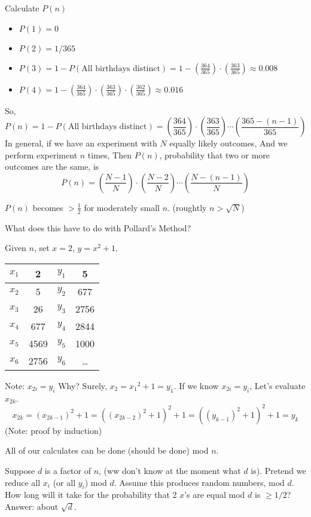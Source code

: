 Calculate $P(n)$
\begin{itemize}
	\item[] $P(1) = 0$ 
	\item[] $P(2) = 1/365$ 
	\item[] $P(3) = 1 - P(\mbox{All birthdays distinct}) = 1 - (\frac{364}{365})\cdot (\frac{363}{365}) \approx 0.008$ 
	\item[] $P(4) = 1 - (\frac{364}{365})\cdot (\frac{363}{365}) \cdot (\frac{362}{365})\approx 0.016$ 
\end{itemize}
So, 
\[
P(n) = 1 - P(\mbox{All birthdays distinct}) = \left(\frac{364}{365}\right)\cdot \left(\frac{363}{365}\right) \cdots \left(\frac{365 - (n-1)}{365}\right)
\]
In general, if we have an experiment with $N$ equally likely outcomes, And we perform experiment $n$ times, Then $P(n)$, probability that two or more outcomes are the same, is
\[
P(n) = \left(\frac{N-1}{N}\right)\cdot \left(\frac{N-2}{N}\right) \cdots \left(\frac{N - (n-1)}{N}\right)
\]

$P(n)$ becomes $> \frac{1}{2}$ for moderately small $n$. (roughtly $n > \sqrt{N}$)

What does this have to do with Pollard's Method?

Given $n$, set $x=2$, $y = x^2 + 1$.

\begin{tabular}{|c|c|c|c|} \hline
	$x_1$ & 2 & $y_1$ & 5 \\ \hline
	$x_2$ & 5 & $y_2$ & 677 \\ \hline
	$x_3$ & 26 & $y_3$ & 2756 \\ \hline
	$x_4$ & 677 & $y_4$ &  2844 \\ \hline
	$x_5$ & 4569 & $y_5$ & 1000 \\ \hline
	$x_6$ & 2756 & $y_6$ & \ldots \\ \hline
\end{tabular}

Note: $x_{2i} = y_i$ Why? Surely, $x_2 = {x_1}^2 + 1 = y_1$. If we know $x_{2i} = y_i$, Let's evaluate $x_{2k}$.
\[
x_{2k} = (x_{2k-1})^2 + 1 = \left( (x_{2k-2})^2 + 1 \right)^2 + 1 = \left( (y_{k-1})^2 + 1\right)^2 + 1 = y_k
\]
(Note: proof by induction)

All of our calculates can be done (should be done) mod $n$.

Suppose $d$ is a factor of $n$, (ww don't know at the moment what $d$ is). Pretend we reduce all $x_i$ (or all $y_i$) mod $d$. Assume this produces random numbers, mod $d$. How long will it take for the probability that 2 $x$'s are equal mod $d$ is $\geq 1/2$? Answer: about $\sqrt{d}$.

